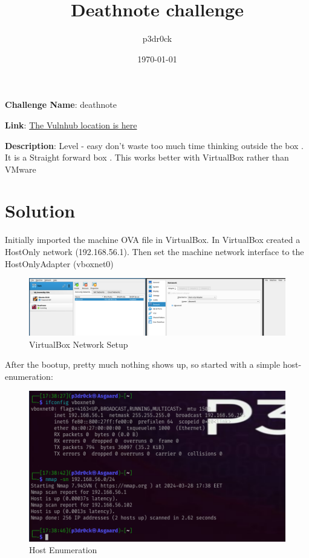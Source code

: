 \documentclass[a4paper,12pt]{article}
\title{Deathnote challenge}
\author{p3dr0ck}
\date{\today}
\newcommand{\challengeName}{deathnote}
\begin{document}
\maketitle


\noindent\textbf{Challenge Name}: \challengeName

\noindent\textbf{Link}: \href{https://www.vulnhub.com/entry/deathnote-1,739/}{The Vulnhub location is here}

\noindent\textbf{Description}: 
Level - easy
don't waste too much time thinking outside the box . It is a Straight forward box .
This works better with VirtualBox rather than VMware


\newpage


\section*{Solution}
Initially imported the machine OVA file in VirtualBox. 
In VirtualBox created a HostOnly network (192.168.56.1).
Then set the machine network interface to the HostOnlyAdapter (vboxnet0)

\begin{figure}[ht!]
	\includegraphics[width=\linewidth]{img/vbox_net_cfg.png}
	\caption{VirtualBox Network Setup}
	\label{fig:vbox_setup}
\end{figure}
 
 
After the bootup, pretty much nothing shows up, so started with a simple host-enumeration:
\begin{figure}[ht!]
	\includegraphics[width=\linewidth]{img/host_enumeration.png}
	\caption{Host Enumeration}
	\label{fig:host_enum}
\end{figure}
\end{document}

